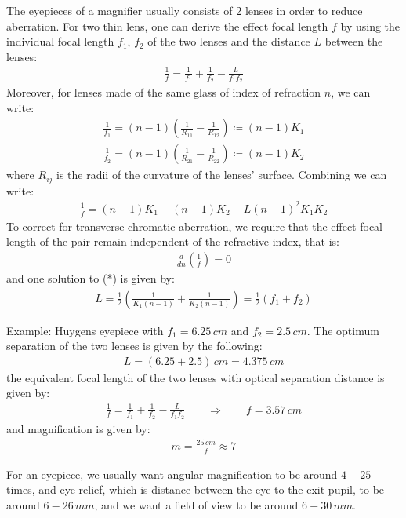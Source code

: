 \documentclass[11pt]{book}
\theoremstyle{break}
\theoremstyle{break}
\newcommand{\example}{\color{green}Example: \color{black}}
\begin{document}
The eyepieces of a magnifier usually consists of 2 lenses in order to reduce aberration. For two thin lens, one can derive the effect focal length $f$ by using the individual focal length $f_1$, $f_2$ of the two lenses and the distance $L$ between the lenses:
\begin{align*}
\frac{1}{f} = \frac{1}{f_1} + \frac{1}{f_2} - \frac{L}{f_1f_2}
\end{align*}
Moreover, for lenses made of the same glass of index of refraction $n$, we can write:
\begin{align*}
\frac{1}{f_1} = (n-1)\left( \frac{1}{R_{11}} - \frac{1}{R_{12}}\right) \coloneqq (n-1)K_1\\
\frac{1}{f_2} = (n-1)\left( \frac{1}{R_{21}} - \frac{1}{R_{22}}\right) \coloneqq (n-1)K_2
\end{align*}
where $R_{ij}$ is the radii of the curvature of the lenses' surface. Combining we can write:
\begin{align*}
\frac{1}{f} = (n-1)K_1 + (n-1)K_2 - L(n-1)^2 K_1K_2
\end{align*}
To correct for transverse chromatic aberration, we require that the effect focal length of the pair remain independent of the refractive index, that is:
\begin{align*}
\frac{d}{dn} \left(\frac{1}{f}\right) = 0 \tag{*}
\end{align*}
and one solution to (*) is given by:
\begin{align*}
L = \frac{1}{2}\left( \frac{1}{K_1(n-1)} + \frac{1}{K_2(n-1)}\right) = \frac{1}{2}(f_1 + f_2)
\end{align*}


\example Huygens eyepiece with $f_1 = 6.25\, cm$ and $f_2 = 2.5\, cm$. The optimum separation of the two lenses is given by the following:
\begin{align*}
L = \left( 6.25 + 2.5\right)\, cm = 4.375\, cm
\end{align*}
the equivalent focal length of the two lenses with optical separation distance is given by:
\begin{align*}
\frac{1}{f} = \frac{1}{f_1} + \frac{1}{f_2} - \frac{L}{f_1f_2} \qquad \Rightarrow \qquad f = 3.57\, cm
\end{align*}
and magnification is given by:
\begin{align*}
m = \frac{25\, cm}{f} \approx 7
\end{align*}

\hfill\break\hfill\break
For an eyepiece, we usually want angular magnification to be around $4-25$ times, and eye relief, which is distance between the eye to the exit pupil, to be around $6-26\, mm$, and we want a field of view to be around $6-30\, mm$. \\
\end{document}
